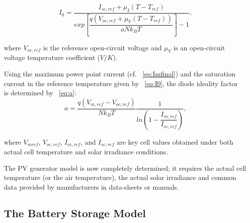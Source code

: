 \documentclass[review]{elsarticle}
\begin{document}
\begin{equation}
\label{eq:I0}
I_{0} = \dfrac{I_{sc,ref} + \mu_{I}(T - T_{ref})}{exp \left[ \dfrac{q(V_{oc,ref} + \mu_{V} (T - T_{ref}))}{aNk_{B}T}    \right] -1},
\end{equation}

\noindent where $ V_{oc,ref} $ is the reference open-circuit voltage and $ \mu_{V} $ is an open-circuit voltage temperature coefficient ($ V/K $).

Using the maximum power point current (cf. ~\eqref{eq:Imfinal}) and the saturation current in the reference temperature given by ~\eqref{eq:I0}, the diode ideality factor~\cite{Saloux} is determined by ~\eqref{eq:a}:
\begin{equation}
\label{eq:a}
a = \dfrac{q(V_{m,ref}-V_{oc,ref})}{Nk_{B}T} \dfrac{1}{ln \left( 1 - \dfrac{I_{m,ref}}{I_{sc,ref}}  \right) },
\end{equation}

\noindent where $V_{mref}$, $V_{oc,ref}$, $I_{m,ref}$, and $I_{sc,ref}$ are key cell values obtained under both actual cell temperature and solar irradiance conditions. %

The PV generator model is now completely determined; it requires the actual cell temperature (or the air temperature), the actual solar irradiance and common data provided by manufacturers in data-sheets or manuals.
%
%
%
%
%
%
\subsection{The Battery Storage Model }
\label{sec:BATmodel}
\end{document}
